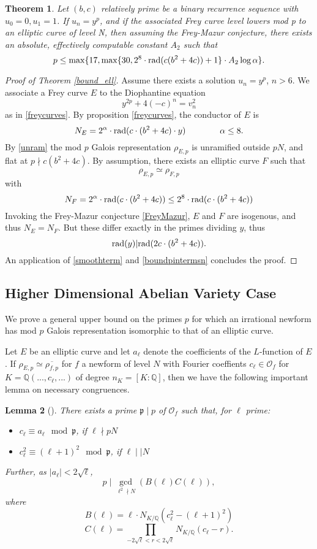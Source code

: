 \documentclass[12pt]{amsart}
\newtheorem{thm}{Theorem}[section]
\newtheorem{lem}[thm]{Lemma}
\theoremstyle{definition}
\def\O{{\mathcal O}}
\def\Q{{\mathbb Q}}
\newcommand{\rad}{{\rm{rad}}}
\renewcommand{\bar}{\overline}
\newcommand{\notdiv}{\nmid}
\begin{document}
\begin{thm}\label{ell_bound_final}
Let $(b,c)$ relatively prime be a binary recurrence sequence with $u_0=0,u_1=1$. If $u_n = y^p$, and if the associated Frey curve level lowers mod p to an elliptic curve of level N, then assuming the Frey-Mazur conjecture, there exists an absolute, effectively computable constant $A_2$ such that
\[ p \leq \max\{17, \max\{30, 2^8 \cdot \rad(c(b^2+4c))+1\} \cdot A_2\log{\alpha} \}. \]
\end{thm}
\begin{proof}[Proof of Theorem \ref{bound_ell}]
Assume there exists a solution $u_n = y^p$, $n > 6$.
We associate a Frey curve $E$ to the Diophantine equation
\[ y^{2p} +4(-c)^n = v_n^2 \]
as in \ref{freycurves}.  By proposition \ref{freycurves}, the conductor of $E$ is
\[ N_E = 2^{\alpha}  \cdot \rad( c \cdot (b^2+4c) \cdot y) \qquad \qquad \alpha \leq 8. \]
By \ref{unram} the mod $p$ Galois representation $\rho_{E,p}$ is unramified outside $pN$, and flat at $p \notdiv c(b^2+4c)$. By assumption, there exists an elliptic curve $F$ such that
\[ \rho_{E,p} \simeq \rho_{F,p} \]  
with
\[N_F = 2^{\alpha} \cdot  \rad( c \cdot (b^2+4c)) \leq 2^8 \cdot \rad(c \cdot (b^2+4c))  \]
Invoking the Frey-Mazur conjecture \ref{FreyMazur}, $E$ and $F$ are isogenous, and thus $N_E = N_F$.  But these differ exactly in the primes dividing $y$, thus
\[ \rad(y) | \rad(2c \cdot (b^2+4c)). \]
 An application of \ref{smoothterm} and \ref{boundpintermsn} concludes the proof.
\end{proof}


\subsection{Higher Dimensional Abelian Variety Case}
We prove a general upper bound on the primes $p$ for which an irrational newform has mod $p$ Galois representation isomorphic to that of an elliptic curve.
 
Let $E$ be an elliptic curve and let $a_\ell$ denote the coefficients of the $L$-function of $E$.  If $\rho_{E,p} \simeq \bar{\rho_{f,p}}$ for $f$ a newform of level $N$ with Fourier coeffients $c_\ell\in \O_f$ for $K =  \Q(...,c_\ell,...)$ of degree $n_K = [K:\mathbb{Q}]$, then we have the following important lemma on necessary congruences.

\begin{lem}[\cite{cohen07}]\label{ircong1}
There exists a prime $\mathfrak{p} \mid p$ of $\mathcal{O}_f$ such that, for $\ell$ prime:
\begin{itemize}
\item $c_\ell \equiv a_\ell \mod \mathfrak{p}$, if $\ell \nmid pN$
\item $c_\ell^2 \equiv (\ell+1)^2 \mod \mathfrak{p}$, if $\ell \mid\mid N$
\end{itemize}
Further, as $|a_\ell| < 2\sqrt{\ell}$,
\[p \mid \gcd_{\ell^2 \nmid N}(B(\ell)C(\ell)), \] where
\[B(\ell) = \ell \cdot N_{K / \mathbb{Q}}(c_\ell^2-(\ell+1)^2) \]
\[C(\ell) = \prod_{-2\sqrt{\ell} < r < 2\sqrt{\ell}}{N_{K / \mathbb{Q}}}(c_\ell - r).\]
\end{lem}
\end{document}
